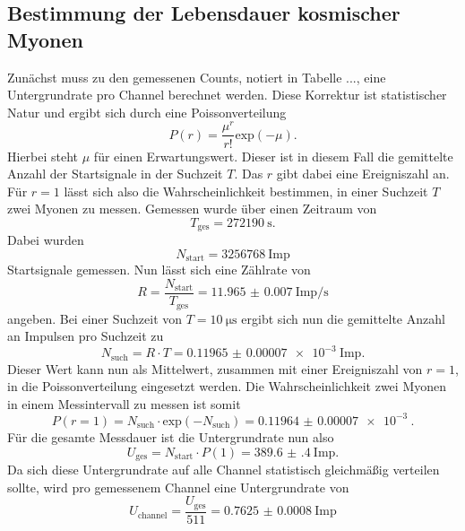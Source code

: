 \subsection{Bestimmung der Lebensdauer kosmischer Myonen}
Zunächst muss zu den gemessenen Counts, notiert in Tabelle ..., eine Untergrundrate pro Channel berechnet werden. Diese Korrektur ist statistischer Natur und ergibt sich durch eine Poissonverteilung \cite{poisson}
\begin{equation*}
P(r) = \frac{\mu^r}{r!}\text{exp}(-\mu).
\end{equation*}
Hierbei steht $\mu$ für einen Erwartungswert. Dieser ist in diesem Fall die gemittelte Anzahl der Startsignale in der Suchzeit $T$. Das $r$ gibt dabei eine Ereigniszahl an. Für $r = 1$ lässt sich
also die Wahrscheinlichkeit bestimmen, in einer Suchzeit $T$ zwei Myonen zu messen.
Gemessen wurde über einen Zeitraum von
\begin{equation*}
T_\text{ges} = \SI{272190}{\second}.
\end{equation*}
Dabei wurden  
\begin{equation*}
    N_\text{start} = \SI{3256768}{{\text{Imp}}}
\end{equation*}
Startsignale gemessen.
Nun lässt sich eine Zählrate von
\begin{equation*}
R = \frac{N_\text{start}}{T_\text{ges}} = \SI{11.965(7)}{{\text{Imp}}\per\second}
\end{equation*}
angeben. Bei einer Suchzeit von $T = \SI{10}{\micro\second}$ ergibt sich nun die gemittelte Anzahl an Impulsen pro Suchzeit zu
\begin{equation*}
    N_{\text{such}} = R \cdot T = \SI{0.11965(7)e-3}{{\text{Imp}}}.
\end{equation*}
Dieser Wert kann nun als Mittelwert, zusammen mit einer Ereigniszahl von $r = 1$, in die Poissonverteilung eingesetzt werden.
Die Wahrscheinlichkeit zwei Myonen in einem Messintervall zu messen ist somit 
\begin{equation*}
P(r=1) = N_{\text{such}} \cdot \text{exp}(-N_{\text{such}}) = \SI{0.11964(7)e-3}{}.
\end{equation*}
Für die gesamte Messdauer ist die Untergrundrate nun also
\begin{equation*}
    U_{\text{ges}} = N_{\text{start}} \cdot P(1) = \SI{389.6(4)}{\text{Imp}}.
\end{equation*}
Da sich diese Untergrundrate auf alle Channel statistisch gleichmäßig verteilen sollte, wird pro gemessenem Channel eine Untergrundrate von
\begin{equation*}
    U_{\text{channel}} = \frac{U_{\text{ges}}}{511} = \SI{0.7625(8)}{\text{Imp}}
\end{equation*}
